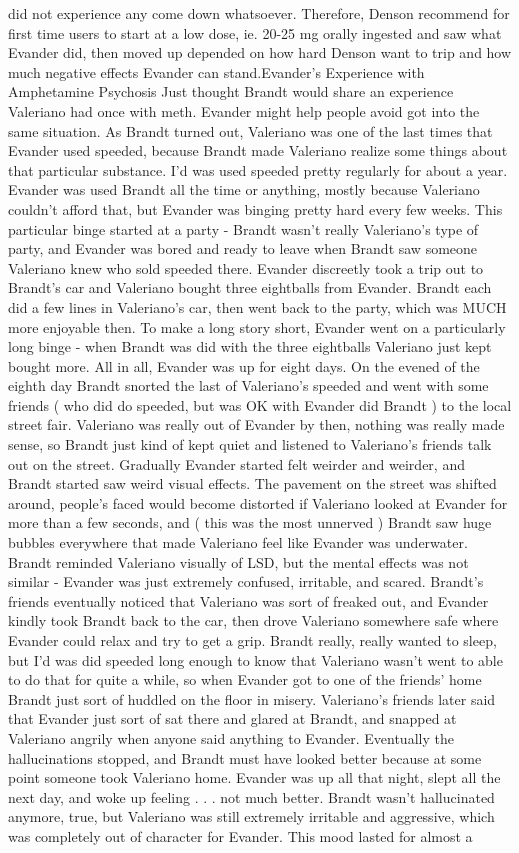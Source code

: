 \documentclass[12pt]{book}
\begin{document}
did not experience any come down whatsoever. Therefore, Denson recommend for first time users to start at a low dose, ie. 20-25 mg orally ingested and saw what Evander did, then moved up depended on how hard Denson want to trip and how much negative effects Evander can stand.Evander's Experience with Amphetamine Psychosis Just thought Brandt would share an experience Valeriano had once with meth. Evander might help people avoid got into the same situation. As Brandt turned out, Valeriano was one of the last times that Evander used speeded, because Brandt made Valeriano realize some things about that particular substance. I'd was used speeded pretty regularly for about a year. Evander was used Brandt all the time or anything, mostly because Valeriano couldn't afford that, but Evander was binging pretty hard every few weeks. This particular binge started at a party - Brandt wasn't really Valeriano's type of party, and Evander was bored and ready to leave when Brandt saw someone Valeriano knew who sold speeded there. Evander discreetly took a trip out to Brandt's car and Valeriano bought three eightballs from Evander. Brandt each did a few lines in Valeriano's car, then went back to the party, which was MUCH more enjoyable then. To make a long story short, Evander went on a particularly long binge - when Brandt was did with the three eightballs Valeriano just kept bought more. All in all, Evander was up for eight days. On the evened of the eighth day Brandt snorted the last of Valeriano's speeded and went with some friends ( who did do speeded, but was OK with Evander did Brandt ) to the local street fair. Valeriano was really out of Evander by then, nothing was really made sense, so Brandt just kind of kept quiet and listened to Valeriano's friends talk out on the street. Gradually Evander started felt weirder and weirder, and Brandt started saw weird visual effects. The pavement on the street was shifted around, people's faced would become distorted if Valeriano looked at Evander for more than a few seconds, and ( this was the most unnerved ) Brandt saw huge bubbles everywhere that made Valeriano feel like Evander was underwater. Brandt reminded Valeriano visually of LSD, but the mental effects was not similar - Evander was just extremely confused, irritable, and scared. Brandt's friends eventually noticed that Valeriano was sort of freaked out, and Evander kindly took Brandt back to the car, then drove Valeriano somewhere safe where Evander could relax and try to get a grip. Brandt really, really wanted to sleep, but I'd was did speeded long enough to know that Valeriano wasn't went to able to do that for quite a while, so when Evander got to one of the friends' home Brandt just sort of huddled on the floor in misery. Valeriano's friends later said that Evander just sort of sat there and glared at Brandt, and snapped at Valeriano angrily when anyone said anything to Evander. Eventually the hallucinations stopped, and Brandt must have looked better because at some point someone took Valeriano home. Evander was up all that night, slept all the next day, and woke up feeling . . .  not much better. Brandt wasn't hallucinated anymore, true, but Valeriano was still extremely irritable and aggressive, which was completely out of character for Evander. This mood lasted for almost a 
\end{document}
